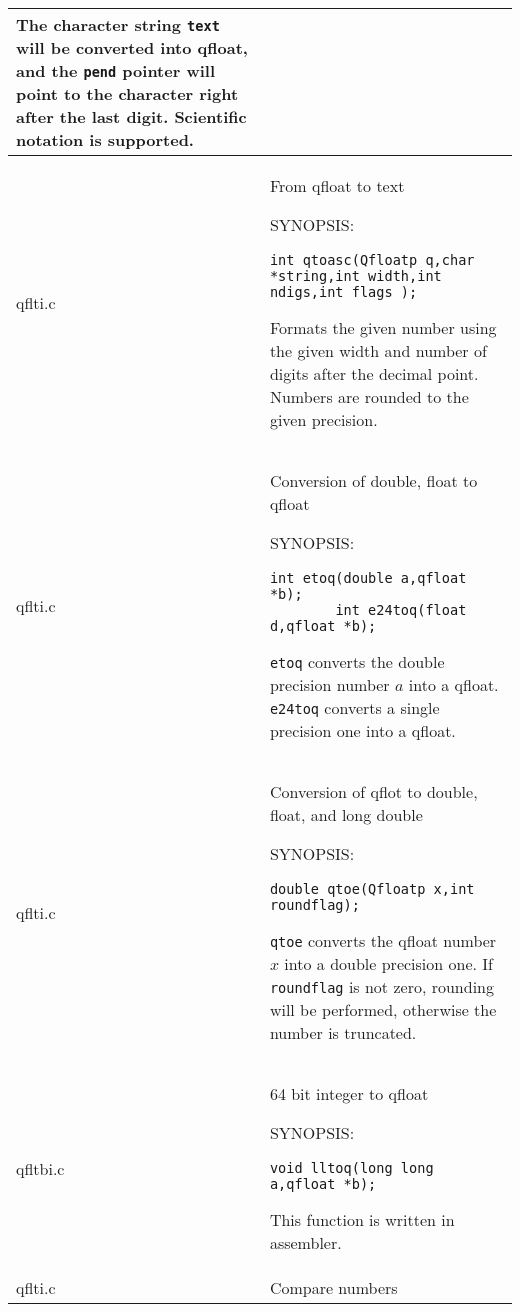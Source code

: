 \documentclass[10pt,a4paper,x11names]{memoir} %
\begin{document}
\begin{longtable}{|p{1.5cm}|p{11.5cm}|}
	The character string \verb,text, will be converted into qfloat, and the \verb,pend, pointer will point to the character right after the last digit. Scientific notation is supported.
	\\\hline
	qflti.c& From qfloat to text\index{qtoasc}
	
	{\footnotesize SYNOPSIS:}\vspace{-0.2cm}
	\begin{lstlisting}[numbers=none]
		int qtoasc(Qfloatp q,char *string,int width,int ndigs,int flags );
	\end{lstlisting}\vspace{-0.2cm} \par
	
	Formats the given number using the given width and number of digits after the decimal point. Numbers are rounded to the given
	precision.
	\\\hline
	qflti.c&Conversion of double, float to qfloat
	
	{\footnotesize SYNOPSIS:}\vspace{-0.2cm}\index{etoq}\index{e24toq}
	\begin{lstlisting}[numbers=none]
		int etoq(double a,qfloat *b);
		int e24toq(float d,qfloat *b);
	\end{lstlisting}\vspace{-0.2cm} \par
	\verb,etoq, converts the double precision number $a$ into a qfloat. \verb,e24toq, converts a single
	precision one into a qfloat.
	\\\hline
	qflti.c& Conversion of qflot to double, float, and long double
	
	{\footnotesize SYNOPSIS:}\vspace{-0.2cm}\index{qtoe}
	\begin{lstlisting}[numbers=none]
		double qtoe(Qfloatp x,int roundflag);
	\end{lstlisting}\vspace{-0.2cm} \par
	
	\verb,qtoe, converts the qfloat number $x$ into a double precision one. If \verb,roundflag, is not zero, rounding will be performed,
	otherwise the number is truncated.
	\\\hline
	qfltbi.c&64 bit integer to qfloat
	
	{\footnotesize SYNOPSIS:}\vspace{-0.2cm}\index{lltoq}
	\begin{lstlisting}[numbers=none]
		void lltoq(long long a,qfloat *b);
	\end{lstlisting}\vspace{-0.2cm} \par
	This function is written in assembler.
	\\\hline
	qflti.c& Compare numbers
	

\end{longtable}
\end{document}

